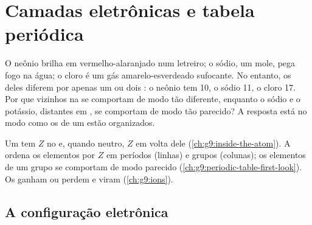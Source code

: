 \chapter{Camadas eletrônicas e tabela periódica}\label{ch:g10:electron-shells}

O neônio brilha em vermelho-alaranjado num letreiro; o sódio, um 
mole, pega fogo na água; o cloro é um gás amarelo-esverdeado sufocante.
No entanto, os  deles diferem por apenas um ou dois : o
neônio tem 10, o sódio 11, o cloro 17. Por que vizinhos na  se comportam de modo tão diferente, enquanto o sódio e o
potássio, distantes em , se comportam de modo tão
parecido? A resposta está no modo como os  de um  estão
organizados.

\begin{recall}
Um  tem $Z$  no  e, quando neutro, $Z$  em
volta dele (\cref{ch:g9:inside-the-atom}). A  ordena os
elementos por $Z$ em períodos (linhas) e grupos (colunas); os elementos
de um grupo se comportam de modo parecido
(\cref{ch:g9:periodic-table-first-look}). Os  ganham ou perdem
 e viram  (\cref{ch:g9:ions}).
\end{recall}

\section{A configuração eletrônica}

